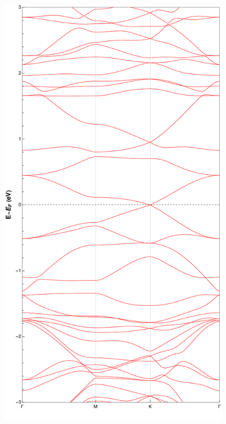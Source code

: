 \documentclass{article}
\begin{document}
\begin{figure}[H]
  \centering
  \begin{minipage}{0.48\textwidth}
    \centering
    \includegraphics[scale=0.4]{../figures/7bs.pdf}
  \end{minipage}
  \begin{minipage}{0.48\textwidth}
    \centering

\end{minipage}
\end{figure}
\end{document}
